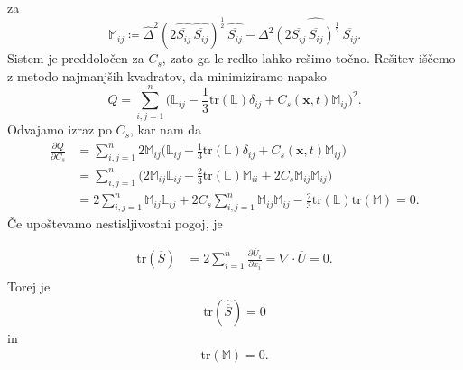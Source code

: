 \documentclass[mat2, tisk]{fmfdelo}
\newcommand{\bd}{\textbf}
\begin{document}
za 
$$
\mathbb{M}_{ij} \coloneqq \widehat{\Delta}^2 (2 \widehat{\overline{S_{ij}}} \,\widehat{\overline{S_{ij}}})^\frac{1}{2} \,\widehat{\overline{S_{ij}}} - \Delta^2 \widehat{(2 \overline{S_{ij}} \,\overline{S_{ij}})^\frac{1}{2} \,\overline{S_{ij}}}.
$$
Sistem je preddoločen za $C_s$, zato ga le redko lahko rešimo točno.
Rešitev iščemo z metodo najmanjših kvadratov, da minimiziramo napako
$$
Q = \sum_{i,j=1}^n \Big(\mathbb{L}_{ij} - \frac{1}{3}\text{tr}(\mathbb{L}) \delta_{ij} + C_s(\bd{x}, t)\mathbb{M}_{ij}\Big)^2.
$$
Odvajamo izraz po $C_s$, kar nam da
\begin{align*}
  \frac{\partial Q}{\partial C_s} &= \sum_{i,j=1}^n 2\mathbb{M}_{ij}\Big(\mathbb{L}_{ij} - \frac{1}{3}\text{tr}(\mathbb{L}) \delta_{ij} + C_s(\bd{x}, t)\mathbb{M}_{ij}\Big)\\
  &= \sum_{i,j=1}^n \Big(2\mathbb{M}_{ij} \mathbb{L}_{ij} - \frac{2}{3} \text{tr}({\mathbb{L}}) \mathbb{M}_{ii} + 2C_s \mathbb{M}_{ij} \mathbb{M}_{ij}\Big)\\
  &= 2\sum_{i,j=1}^n \mathbb{M}_{ij} \mathbb{L}_{ij} + 2C_s \sum_{i,j=1}^n \mathbb{M}_{ij} \mathbb{M}_{ij} - \frac{2}{3} \text{tr}({\mathbb{L}}) \text{tr}(\mathbb{M}) = 0.
\end{align*}
Če upoštevamo nestisljivostni pogoj, je 

\begin{align*}
\text{tr}(\overline{S}) &= 2\sum_{i=1}^n \frac{\partial \overline{U}_i}{\partial x_i} = \nabla \cdot \overline{U} = 0. \\
\end{align*}
Torej je 
\begin{align*}
\text{tr}(\widehat{\overline{S}}) = 0
\end{align*}
in
\begin{align*}
\text{tr}(\mathbb{M}) = 0.
\end{align*}
\end{document}
